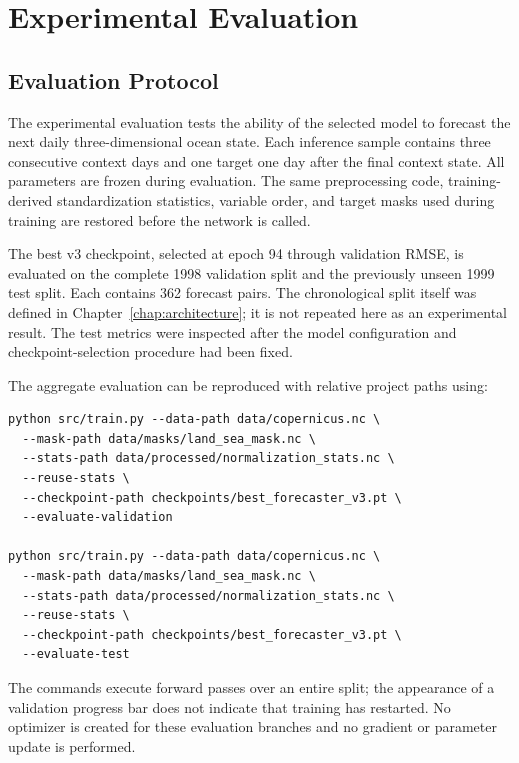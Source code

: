 \chapter{Experimental Evaluation}
\label{chap:evaluation}

\section{Evaluation Protocol}

The experimental evaluation tests the ability of the selected model to forecast the next daily three-dimensional ocean state. Each inference sample contains three consecutive context days and one target one day after the final context state. All parameters are frozen during evaluation. The same preprocessing code, training-derived standardization statistics, variable order, and target masks used during training are restored before the network is called.

The best v3 checkpoint, selected at epoch 94 through validation RMSE, is evaluated on the complete 1998 validation split and the previously unseen 1999 test split. Each contains 362 forecast pairs. The chronological split itself was defined in Chapter~\ref{chap:architecture}; it is not repeated here as an experimental result. The test metrics were inspected after the model configuration and checkpoint-selection procedure had been fixed.

The aggregate evaluation can be reproduced with relative project paths using:

\begin{lstlisting}[caption={Inference commands for the selected checkpoint.}]
python src/train.py --data-path data/copernicus.nc \
  --mask-path data/masks/land_sea_mask.nc \
  --stats-path data/processed/normalization_stats.nc \
  --reuse-stats \
  --checkpoint-path checkpoints/best_forecaster_v3.pt \
  --evaluate-validation

python src/train.py --data-path data/copernicus.nc \
  --mask-path data/masks/land_sea_mask.nc \
  --stats-path data/processed/normalization_stats.nc \
  --reuse-stats \
  --checkpoint-path checkpoints/best_forecaster_v3.pt \
  --evaluate-test
\end{lstlisting}

The commands execute forward passes over an entire split; the appearance of a validation progress bar does not indicate that training has restarted. No optimizer is created for these evaluation branches and no gradient or parameter update is performed.

